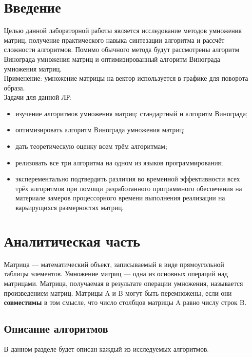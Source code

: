\documentclass[12pt,a4paper]{article}
\numberwithin{equation}{section}
\begin{document}
\section*{\Huge Введение}
\qquad Целью данной лабораторной работы является исследование методов умножения матриц, получение практического навыка синтезации алгоритма и рассчёт сложности алгоритмов. Помимо обычного метода будут рассмотрены алгоритм Винограда умножения матриц и оптимизированный алгоритм Винограда умножения матриц.\\
\qquad Применение: умножение матрицы на вектор используется в графике для поворота образа.\\
\qquad Задачи для данной ЛР:
\begin{itemize}
\item изучение алгоритмов умножения матриц: стандартный и алгоритм Винограда;
\item оптимизировать алгоритм Винограда умножения матриц;
\item дать теоретическую оценку всем трём алгоритмам;
\item релизовать все три алгоритма на одном из языков программирования;
\item эксперементально подтвердить различия во временной эффективности всех трёх алгоритмов при помощи разработанного программного обеспечения на материале замеров процессорного времени выполнения реализации на варьирущихся размерностях матриц.
\end{itemize}
\clearpage

\section{Аналитическая часть}
\qquad Матрица — математический объект, записываемый в виде прямоугольной таблицы элементов. Умножение матриц — одна из основных операций над матрицами. Матрица, получаемая в результате операции умножения, называется произведением матриц. Матрицы A и B могут быть перемножены, если они \textbf{совместимы} в том смысле, что число столбцов матрицы A равно числу строк B.

\subsection{Описание алгоритмов}
\qquad В данном разделе будет описан каждый из исследуемых алгоритмов.
\end{document}
